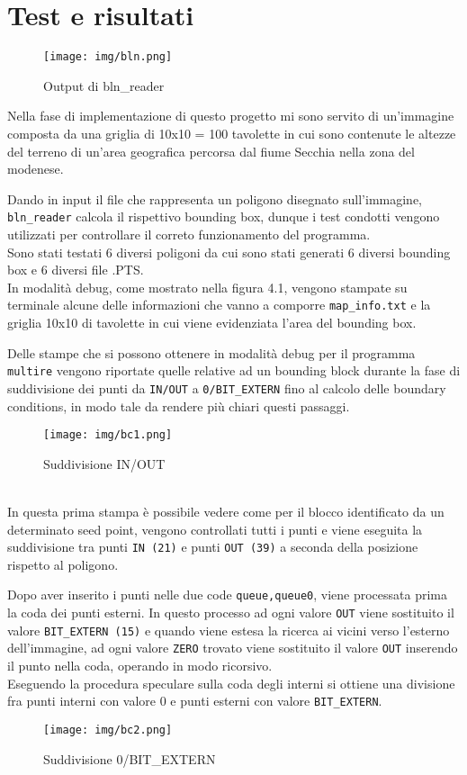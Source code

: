 \chapter{Test e risultati}
	\begin{figure}[!bp]
		\centering
		\texttt{[image: img/bln.png]}
		\caption{Output di bln\_reader}
	\end{figure}
	Nella fase di implementazione di questo progetto mi sono servito di un'immagine composta da una griglia di 10x10 = 100 tavolette in cui sono contenute le altezze del terreno di un'area geografica percorsa dal fiume Secchia nella zona del modenese.

	Dando in input il file che rappresenta un poligono disegnato sull'immagine, \texttt{bln\_reader} calcola il rispettivo bounding box, dunque i test condotti vengono utilizzati per controllare il correto funzionamento del programma.\\
	Sono stati testati 6 diversi poligoni da cui sono stati generati 6 diversi bounding box e 6 diversi file .PTS.\\
	In modalit\`{a} debug, come mostrato nella figura 4.1, vengono stampate su terminale alcune delle informazioni che vanno a comporre \texttt{map\_info.txt} e la griglia 10x10 di tavolette  in cui viene evidenziata l'area del bounding box. 

	Delle stampe che si possono ottenere in modalit\`{a} debug per il programma \texttt{multire} vengono riportate quelle relative ad un bounding block durante la fase di suddivisione dei punti da \texttt{IN/OUT} a \texttt{0/BIT\_EXTERN} fino al calcolo delle boundary conditions, in modo tale da rendere pi\`{u} chiari questi passaggi.
	\begin{figure}[htbp]
		\centering
		\texttt{[image: img/bc1.png]}
		\caption{Suddivisione IN/OUT}
	\end{figure}\\
	In questa prima stampa \`{e} possibile vedere come per il blocco identificato da un determinato seed point, vengono controllati tutti i punti e viene eseguita la suddivisione tra punti \texttt{IN (21)} e punti \texttt{OUT (39)} a seconda della posizione rispetto al poligono.

	Dopo aver inserito i punti nelle due code \texttt{queue,queue0}, viene processata prima la coda dei punti esterni. In questo processo ad ogni valore \texttt{OUT} viene sostituito il valore \texttt{BIT\_EXTERN (15)} e quando viene estesa la ricerca ai vicini verso l'esterno dell'immagine, ad ogni valore \texttt{ZERO} trovato viene sostituito il valore \texttt{OUT} inserendo il punto nella coda, operando in modo ricorsivo.\\
	Eseguendo la procedura speculare sulla coda degli interni si ottiene una divisione fra punti interni con valore 0  e punti esterni con valore \texttt{BIT\_EXTERN}.
	\newpage
	\begin{figure}[htbp]
		\centering
		\texttt{[image: img/bc2.png]}
		\caption{Suddivisione 0/BIT\_EXTERN}
	\end{figure}

